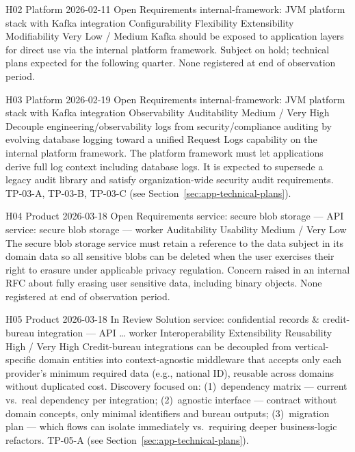 \hypoboxnine%
  {H02}%
  {Platform}%
  {2026-02-11}%
  {Open}%
  {Requirements}%
  {internal-framework: JVM platform stack with Kafka integration}%
  {Configurability \textbar{} Flexibility \textbar{} Extensibility \textbar{} Modifiability}%
  {Very Low / Medium}%
  {Kafka should be exposed to application layers for direct use via the internal
   platform framework.}%
\hypoboxtail%
  {Subject on hold; technical plans expected for the following quarter.}%
  {None registered at end of observation period.}

\hypoboxnine%
  {H03}%
  {Platform}%
  {2026-02-19}%
  {Open}%
  {Requirements}%
  {internal-framework: JVM platform stack with Kafka integration}%
  {Observability \textbar{} Auditability}%
  {Medium / Very High}%
  {Decouple engineering/observability logs from security/compliance auditing by
   evolving database logging toward a unified Request Logs capability on the
   internal platform framework.}%
\hypoboxtail%
  {The platform framework must let applications derive full log context including
   database logs. It is expected to supersede a legacy audit library and satisfy
   organization-wide security audit requirements.}%
  {TP-03-A, TP-03-B, TP-03-C (see Section~\ref{sec:app-technical-plans}).}

\hypoboxnine%
  {H04}%
  {Product}%
  {2026-03-18}%
  {Open}%
  {Requirements}%
  {service: secure blob storage — API \textbar{} service: secure blob storage — worker}%
  {Auditability \textbar{} Usability}%
  {Medium / Very Low}%
  {The secure blob storage service must retain a reference to the data subject in
   its domain data so all sensitive blobs can be deleted when the user exercises
   their right to erasure under applicable privacy regulation.}%
\hypoboxtail%
  {Concern raised in an internal RFC about fully erasing user sensitive data,
   including binary objects.}%
  {None registered at end of observation period.}

\hypoboxnine%
  {H05}%
  {Product}%
  {2026-03-18}%
  {In Review}%
  {Solution}%
  {service: confidential records \& credit-bureau integration — API \textbar{} \ldots{} worker}%
  {Interoperability \textbar{} Extensibility \textbar{} Reusability}%
  {High / Very High}%
  {Credit-bureau integrations can be decoupled from vertical-specific domain
   entities into context-agnostic middleware that accepts only each provider's
   minimum required data (e.g., national ID), reusable across domains without
   duplicated cost.}%
\hypoboxtail%
  {Discovery focused on: (1)~dependency matrix --- current vs.\ real dependency
   per integration; (2)~agnostic interface --- contract without domain concepts,
   only minimal identifiers and bureau outputs; (3)~migration plan --- which flows
   can isolate immediately vs.\ requiring deeper business-logic refactors.}%
  {TP-05-A (see Section~\ref{sec:app-technical-plans}).}

